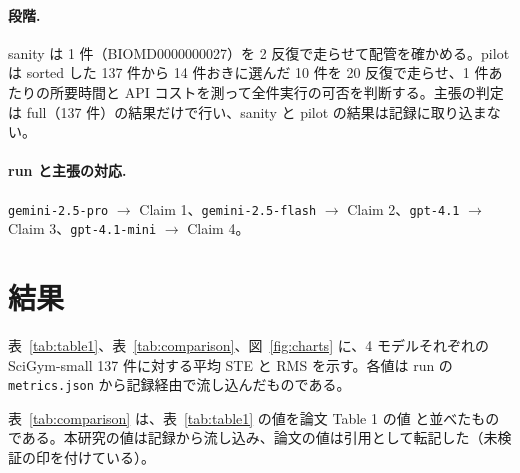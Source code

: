 \documentclass{article}
\begin{document}
\paragraph{段階.}
sanity は 1 件（BIOMD0000000027）を 2 反復で走らせて配管を確かめる。pilot は sorted した 137 件から 14 件おきに選んだ 10 件を 20 反復で走らせ、1 件あたりの所要時間と API コストを測って全件実行の可否を判断する。主張の判定は full（137 件）の結果だけで行い、sanity と pilot の結果は記録に取り込まない。

\paragraph{run と主張の対応.}
\texttt{gemini-2.5-pro} $\to$ Claim 1、\texttt{gemini-2.5-flash} $\to$ Claim 2、\texttt{gpt-4.1} $\to$ Claim 3、\texttt{gpt-4.1-mini} $\to$ Claim 4。


\section{結果}
\label{sec:results}
表~\ref{tab:table1}、表~\ref{tab:comparison}、図~\ref{fig:charts} に、4 モデルそれぞれの SciGym-small 137 件に対する平均 STE と RMS を示す。各値は run の \texttt{metrics.json} から記録経由で流し込んだものである。



表~\ref{tab:comparison} は、表~\ref{tab:table1} の値を論文 Table 1 の値 \cite[s1.p5]{duan-2025-measuring} と並べたものである。本研究の値は記録から流し込み、論文の値は引用として転記した（未検証の印を付けている）。
\end{document}
